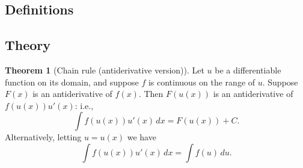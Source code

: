 \documentclass[11pt]{article}
\theoremstyle{definition}
\newtheorem*{comment}{Comment}
\theoremstyle{named}
\newtheorem*{namedtheorem}{Theorem}
\numberwithin{myalgctr}{section}
\begin{document}
\thispagestyle{fancy}
\subsection*{Definitions}



 \subsection*{Theory}

\begin{namedtheorem}[Chain rule (antiderivative version)] Let $u$ be a differentiable function on its domain, and suppose $f$ is continuous on the range of $u$. Suppose $F(x)$ is an antiderivative of $f(x)$. Then $F(u(x))$ is an antiderivative of $f(u(x))u'(x)$: i.e.,
  \[
  \int f(u(x))u'(x)\, dx=F(u(x))+C.
  \]
  Alternatively, letting $u=u(x)$ we have
  \[
  \int f(u(x))u'(x)\, dx=\int f(u)\, du.
  \]
\end{namedtheorem}
\begin{comment}
Before seeing how to correctly use the chain rule (antiderivative version) to compute indefinite integrals, it is worthwhile noting a tempting, but {\em incorrect} method: namely, if $F(x)$ is an antiderivative of $f(x)$ it is not in general true that $F(u(x))$ is an antiderivative of $f(u(x))$. Indeed, the chain rule tells us that $F(u(x))$ is an antiderivative of $f(u(x))u'(x)$.

\end{comment}


\end{document}
